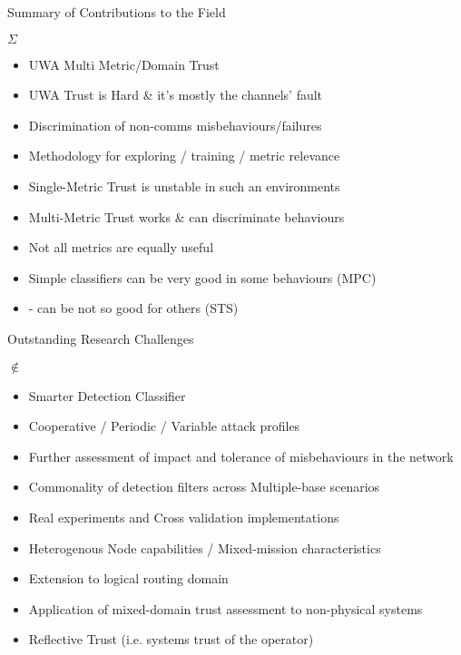 \documentclass[aspectratio=169]{beamer}
\begin{document}
\begin{frame}{Summary of Contributions to the Field}
	\begin{block}{$\Sigma$}
		\begin{itemize}
			\item UWA Multi Metric/Domain Trust
			\item UWA Trust is \alert{Hard} \& it's mostly the channels' fault
			\item Discrimination of non-comms misbehaviours/failures 
			\item Methodology for exploring / training / metric relevance
			\item Single-Metric Trust is \alert{unstable} in such an environments
			\item Multi-Metric Trust works \& can \alert{discriminate behaviours}
			\item \alert{Not all metrics} are equally useful
			\item Simple classifiers \alert{can} be very good in \alert{some} behaviours (MPC)
			\item - can be \alert{not so good} for others (STS)
		\end{itemize}
	\end{block}
\end{frame}

\begin{frame}{Outstanding Research Challenges}
  \begin{alertblock}{$\notin$}
    \begin{itemize}
      \item Smarter Detection Classifier
      \item Cooperative / Periodic / Variable attack profiles
      \item Further assessment of impact and tolerance of misbehaviours in the network
      \item Commonality of detection filters across Multiple-base scenarios
      \item \alert{Real} experiments and Cross validation implementations
      \item Heterogenous Node capabilities / Mixed-mission characteristics
      \item Extension to logical routing domain
      \item Application of mixed-domain trust assessment to non-physical systems
      \item Reflective Trust (i.e. systems trust of the operator)

    \end{itemize}
  \end{alertblock}
\end{frame}
\end{document}
